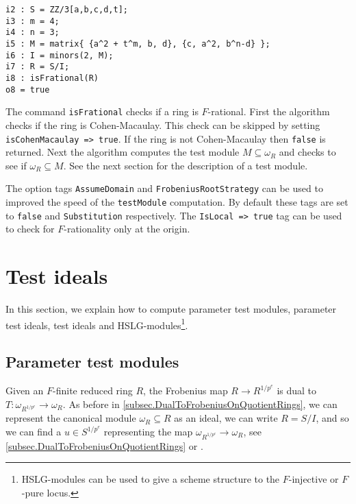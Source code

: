 \documentclass[11pt]{amsart}
\begin{document}
\begin{verbatim}
i2 : S = ZZ/3[a,b,c,d,t];
i3 : m = 4;
i4 : n = 3;
i5 : M = matrix{ {a^2 + t^m, b, d}, {c, a^2, b^n-d} };
i6 : I = minors(2, M);
i7 : R = S/I;
i8 : isFrational(R)
o8 = true
\end{verbatim}


The command {\tt isFrational} checks if a ring is $F$-rational. First the
algorithm checks if the ring is Cohen-Macaulay.
This check can be skipped by setting {\tt isCohenMacaulay => true}. If the ring
is not Cohen-Macaulay then {\tt false} is returned. Next the algorithm
computes the test module $M \subseteq \omega_{R}$ and checks to see if
$\omega_{R} \subseteq M$.  See the next section for the description of a test module.


The option tags {\tt AssumeDomain} and {\tt FrobeniusRootStrategy} can be
used to improved the speed of the {\tt testModule} computation. By default
these tags are set to {\tt false} and {\tt Substitution} respectively. The
{\tt IsLocal => true} tag can be used to check for $F$-rationality only at
the origin.


\section{Test ideals}\label{Section: Test Ideals}

In this section, we explain how to compute parameter test modules, parameter test ideals, test ideals and HSLG-modules\footnote{HSLG-modules can be used to give a scheme structure to the $F$-injective or $F$-pure locus.}.

\subsection{Parameter test modules}

Given an $F$-finite reduced ring $R$, the Frobenius map $R \to R^{1/p^e}$ is dual to $T : \omega_{R^{1/p^e}} \to \omega_R$.  As before in \autoref{subsec.DualToFrobeniusOnQuotientRings}, we can represent the canonical module $\omega_R \subseteq R$ as an ideal, we can write $R = S/I$, and so we can find a $u \in S^{1/p^e}$ representing the map $\omega_{R^{1/p^e}} \to \omega_R$, see \autoref{subsec.DualToFrobeniusOnQuotientRings} or \cite{KatzmanParameterTestIdealOfCMRings}.  
\end{document}

